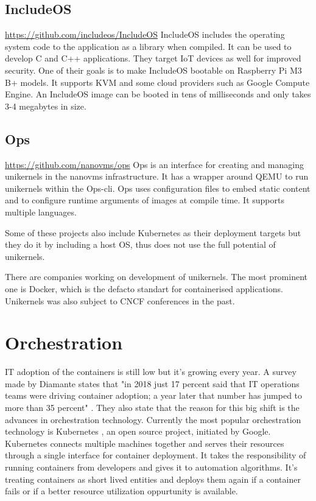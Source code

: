 \subsection*{IncludeOS}
\url{https://github.com/includeos/IncludeOS} \cite{7396164}
IncludeOS includes the operating system code to the application as a library when compiled. It can be used to develop C and C++ applications. They target IoT devices as well for improved security. One of their goals is to make IncludeOS bootable on Raspberry Pi M3 B+ models. It supports KVM and some cloud providers such as Google Compute Engine. An IncludeOS image can be booted in tens of milliseconds and only takes 3-4 megabytes in size.

\subsection*{Ops}
\url{https://github.com/nanovms/ops}
  Ops is an interface for creating and managing unikernels in the nanovms infrastructure. \cite{nanovms} It has a wrapper around QEMU to run unikernels within the Ops-cli\cite{qemu}. Ops uses configuration files to embed static content and to configure runtime arguments of images at compile time. It supports multiple languages.

Some of these projects also include Kubernetes as their deployment targets but they do it by including a host OS, thus does not use the full potential of unikernels.

There are companies working on development of unikernels. The most prominent one is Docker, which is the defacto standart for containerised applications. \cite{francia_2016} Unikernels was also subject to CNCF conferences in the past.

\section{Orchestration}
IT adoption of the containers is still low but it's growing every year. A survey made by Diamante states that "in 2018 just 17 percent said that IT operations teams were driving container adoption; a year later that number has jumped to more than 35 percent" \cite{diamante}. They also state that the reason for this big shift is the advances in orchestration technology. Currently the most popular orchestration technology is Kubernetes , an open source project, initiated by Google. Kubernetes connects multiple machines together and serves their resources through a single interface for container deployment. It takes the responsibility of running containers from developers and gives it to automation algorithms. It's treating containers as short lived entities and deploys them again if a container fails or if a better resource utilization oppurtunity is available.

